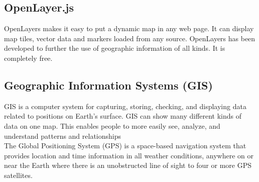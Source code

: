\subsection{OpenLayer.js}
OpenLayers makes it easy to put a dynamic map in any web page. It can display map tiles, vector data and markers loaded from any source. OpenLayers has been developed to further the use of geographic information of all kinds. It is completely free.\\
\subsection{Geographic Information Systems (GIS)}
GIS is a computer system for capturing, storing, checking, and displaying data related to positions on Earth’s surface. GIS can show many different kinds of data on one map. This enables people to more easily see, analyze, and understand patterns and relationships\\
The Global Positioning System (GPS) is a space-based navigation system that provides location and time information in all weather conditions, anywhere on or near the Earth where there is an unobstructed line of sight to four or more GPS satellites.\\
